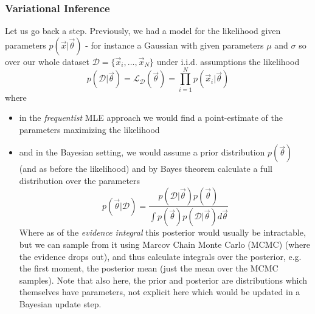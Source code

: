 \subsubsection{Variational Inference}
Let us go back a step. Previously, we had a model
for the likelihood given parameters $p(\vec{x}|\vec{\theta})$ - for instance a Gaussian with
given parameters $\mu$ and $\sigma$ so over our 
whole dataset $\mathcal{D} = \{ \vec{x}_i, \dots, \vec{x}_N \}$ under i.i.d.
assumptions the likelihood
\begin{equation}
    p(\mathcal{D}|\vec{\theta}) = \mathcal{L}_\mathcal{D}(\vec{\theta}) = \prod_{i = 1}^{N} p(\vec{x}_i|\vec{\theta})
\end{equation}
where
\begin{itemize}
    \item in the \textit{frequentist} MLE approach we would find a point-estimate of the parameters
    maximizing the likelihood
    \item and in the Bayesian setting, we would assume a prior distribution $p(\vec{\theta})$ (and as before the likelihood) and 
    by Bayes theorem calculate a full distribution over the parameters
    \begin{equation}
        p(\vec{\theta}|\mathcal{D}) = \frac{p(\mathcal{D}|\vec{\theta}) p(\vec{\theta})}{\int p(\vec{\theta}) p(\mathcal{D}|\vec{\theta}) d\vec{\theta}}
    \end{equation}
    Where as of the \textit{evidence integral} this posterior would usually be intractable, but we can sample from it using Marcov Chain Monte Carlo (MCMC)
    (where the evidence drops out), and thus calculate integrals over the posterior, e.g. the first moment, the posterior mean (just the mean over the 
    MCMC samples). Note that also here, the prior and posterior are distributions which themselves have parameters, not explicit here
    which would be updated in a Bayesian update step.
\end{itemize}


